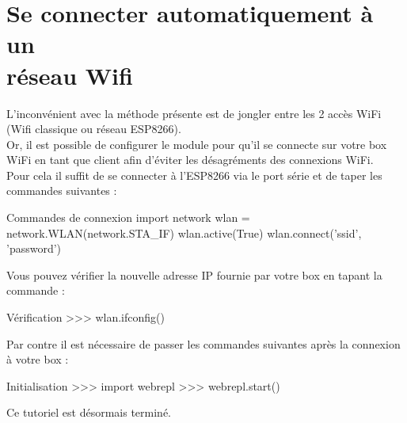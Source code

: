 \chapter{Se connecter automatiquement à un \\réseau Wifi}

L’inconvénient avec la méthode présente est de jongler entre les 2 accès WiFi (Wifi classique ou réseau ESP8266).\\
Or, il est possible de configurer le module pour qu’il se connecte sur votre box WiFi en tant que client afin d'éviter les désagréments des connexions WiFi. \\
Pour cela il suffit de se connecter à l'ESP8266 via le port série et de taper les commandes suivantes : 
\begin{Bash}{Commandes de connexion}
import network
wlan = network.WLAN(network.STA_IF)
wlan.active(True)
wlan.connect('ssid', 'password')
\end{Bash}

Vous pouvez vérifier la nouvelle adresse IP fournie par votre box en tapant la commande :
\begin{Bash}{Vérification}
>>> wlan.ifconfig()
\end{Bash}

Par contre il est nécessaire de passer les commandes suivantes après la connexion à votre box :

\begin{Bash}{Initialisation}
>>> import webrepl
>>> webrepl.start()
\end{Bash}


Ce tutoriel est désormais terminé.